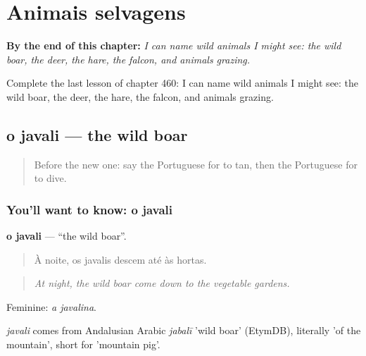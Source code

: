 
\chapter{Animais selvagens}
\label{ch:pt-animais-selvagens}

\begin{chapteropening}
\textbf{By the end of this chapter:} \emph{I can name wild animals I might see: the wild boar, the deer, the hare, the falcon, and animals grazing.}

Complete the last lesson of chapter 460: I can name wild animals I might see: the wild boar, the deer, the hare, the falcon, and animals grazing.
\end{chapteropening}

\section[o javali]{o javali — the wild boar}

\label{lesson:PT-C460-javali}



\begin{quote}
Before the new one: say the Portuguese for to tan, then the Portuguese for to dive.
\end{quote}

\subsection*{You'll want to know: o javali}
\textbf{o javali} — \textquotedblleft{}the wild boar\textquotedblright{}.

\begin{quote}
À noite, os javalis descem até às hortas.
\end{quote}

\begin{quote}
\emph{At night, the wild boar come down to the vegetable gardens.}
\end{quote}

Feminine: \emph{a javalina}.

\begin{cousinweb}
\emph{javali} comes from Andalusian Arabic \emph{jabalī} 'wild boar' (EtymDB), literally 'of the mountain', short for 'mountain pig'.
\end{cousinweb}

